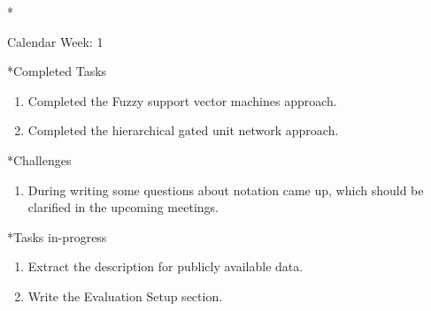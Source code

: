\documentclass[11pt,a4paper]{article}
\begin{document}
\newpage
\begin{section}*{Calendar Week: 1 \hfill \date{08 January, 2021}}
 \begin{refsection}

       \begin{subsection}*{Completed Tasks}
             \begin{enumerate}
                   \item
                         Completed the Fuzzy support vector machines approach.
                   \item
                         Completed the hierarchical gated unit network approach.
             \end{enumerate}
       \end{subsection}

       \begin{subsection}*{Challenges}
             \begin{enumerate}
                   \item
                         During writing some questions about notation came up, which should be clarified in the upcoming meetings.
             \end{enumerate}
       \end{subsection}

       \begin{subsection}*{Tasks in-progress}
             \begin{enumerate}
                   \item
                         Extract the description for publicly available data.
                   \item
                         Write the Evaluation Setup section.
             \end{enumerate}
       \end{subsection}

 \end{refsection}
\end{section}
\end{document}
